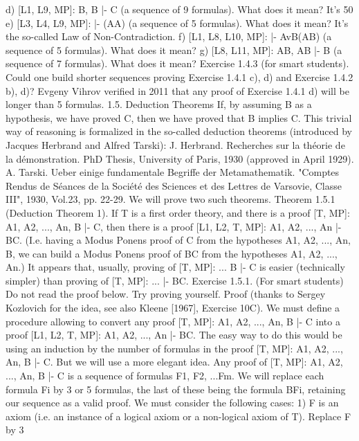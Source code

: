 d) [L1, L9, MP]: B, \neg B |- \neg C (a sequence of 9 formulas). What does it mean? It's 50%
e) [L3, L4, L9, MP]: |- \neg (A\AND \neg A) (a sequence of 5 formulas). What does it mean? It's the so-called Law of
Non-Contradiction.
f) [L1, L8, L10, MP]: |- \neg AvB\IMPLIES (A\IMPLIES B) (a sequence of 5 formulas). What does it mean?
g) [L8, L11, MP]: A\IMPLIES B, \neg A\IMPLIES B |- B (a sequence of 7 formulas). What does it mean?
Exercise 1.4.3 (for smart students). Could one build shorter sequences proving Exercise 1.4.1 c), d) and
Exercise 1.4.2 b), d)? Evgeny Vihrov verified in 2011 that any proof of Exercise 1.4.1 d) will be longer
than 5 formulas.
1.5. Deduction Theorems
If, by assuming B as a hypothesis, we have proved C, then we have proved that B implies C. This trivial
way of reasoning is formalized in the so-called deduction theorems (introduced by Jacques Herbrand
and Alfred Tarski):
J. Herbrand. Recherches sur la théorie de la démonstration. PhD Thesis, University of Paris, 1930 (approved in April 1929).
A. Tarski. Ueber einige fundamentale Begriffe der Metamathematik. "Comptes Rendus de Séances de la Société des Sciences
et des Lettres de Varsovie, Classe III", 1930, Vol.23, pp. 22-29.
We will prove two such theorems.
Theorem 1.5.1 (Deduction Theorem 1). If T is a first order theory, and there is a proof [T, MP]: A1,
A2, ..., An, B |- C, then there is a proof [L1, L2, T, MP]: A1, A2, ..., An |- B\IMPLIES C. (I.e. having a Modus
Ponens proof of C from the hypotheses A1, A2, ..., An, B, we can build a Modus Ponens proof of B\IMPLIES C
from the hypotheses A1, A2, ..., An.)
It appears that, usually, proving of [T, MP]: ... B |- C is easier (technically simpler) than proving of [T,
MP]: ... |- B\IMPLIES C.
Exercise 1.5.1. (For smart students) Do not read the proof below. Try proving yourself.
Proof (thanks to Sergey Kozlovich for the idea, see also Kleene [1967], Exercise 10C). We must define a
procedure allowing to convert any proof [T, MP]: A1, A2, ..., An, B |- C into a proof [L1, L2, T, MP]: A1,
A2, ..., An |- B\IMPLIES C.
The easy way to do this would be using an induction by the number of formulas in the proof [T, MP]: A1,
A2, ..., An, B |- C. But we will use a more elegant idea. Any proof of [T, MP]: A1, A2, ..., An, B |- C is a
sequence of formulas F1, F2, ...Fm. We will replace each formula Fi by 3 or 5 formulas, the last of these
being the formula B\IMPLIES Fi, retaining our sequence as a valid proof.
We must consider the following cases:
1) F is an axiom (i.e. an instance of a logical axiom or a non-logical axiom of T). Replace F by 3
